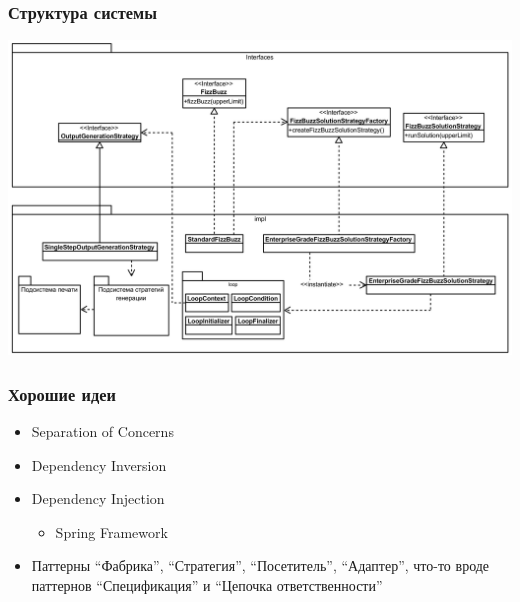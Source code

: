 \documentclass[xetex,mathserif,serif]{beamer}
\begin{document}
	\begin{frame}
		\frametitle{Структура системы}
		\begin{center}
			\includegraphics[width=\textwidth]{fizzBuzzArchitecture.png}
		\end{center}
	\end{frame}

	\begin{frame}
		\frametitle{Хорошие идеи}
		\begin{itemize}
			\item Separation of Concerns
			\item Dependency Inversion
			\item Dependency Injection
			\begin{itemize}
				\item Spring Framework
			\end{itemize}
			\item Паттерны ``Фабрика'', ``Стратегия'', ``Посетитель'', ``Адаптер'', что-то вроде паттернов ``Спецификация'' и ``Цепочка ответственности''
		\end{itemize}
	\end{frame}
\end{document}

